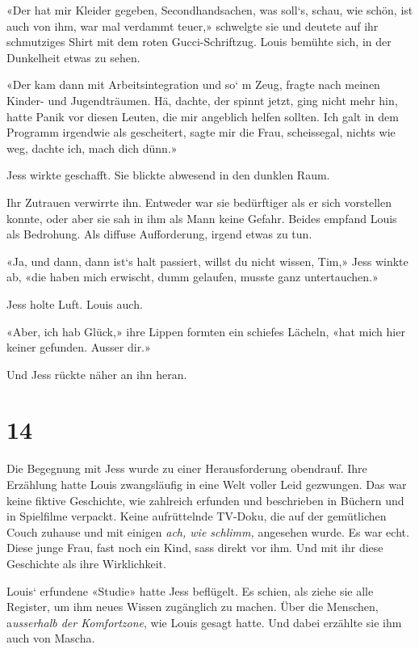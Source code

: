 «Der hat mir Kleider gegeben, Secondhandsachen, was soll`s, schau, wie
schön, ist auch von ihm, war mal verdammt teuer,» schwelgte sie und
deutete auf ihr schmutziges Shirt mit dem roten Gucci-Schriftzug. Louis
bemühte sich, in der Dunkelheit etwas zu sehen.

«Der kam dann mit Arbeitsintegration und so` m Zeug, fragte nach meinen
Kinder- und Jugendträumen. Hä, dachte, der spinnt jetzt, ging nicht mehr
hin, hatte Panik vor diesen Leuten, die mir angeblich helfen sollten.
Ich galt in dem Programm irgendwie als gescheitert, sagte mir die Frau,
scheissegal, nichts wie weg, dachte ich, mach dich dünn.»

Jess wirkte geschafft. Sie blickte abwesend in den dunklen Raum.

Ihr Zutrauen verwirrte ihn. Entweder war sie bedürftiger als er sich
vorstellen konnte, oder aber sie sah in ihm als Mann keine Gefahr.
Beides empfand Louis als Bedrohung. Als diffuse Aufforderung, irgend
etwas zu tun.

«Ja, und dann, dann ist`s halt passiert, willst du nicht wissen, Tim,»
Jess winkte ab, «die haben mich erwischt, dumm gelaufen, musste ganz
untertauchen.»

Jess holte Luft. Louis auch.

«Aber, ich hab Glück,» ihre Lippen formten ein schiefes Lächeln, «hat
mich hier keiner gefunden. Ausser dir.»

Und Jess rückte näher an ihn heran.

\chapter{14}\label{section-13}

Die Begegnung mit Jess wurde zu einer Herausforderung obendrauf. Ihre
Erzählung hatte Louis zwangsläufig in eine Welt voller Leid gezwungen.
Das war keine fiktive Geschichte, wie zahlreich erfunden und beschrieben
in Büchern und in Spielfilme verpackt. Keine aufrüttelnde TV-Doku, die
auf der gemütlichen Couch zuhause und mit einigen \emph{ach, wie
schlimm,} angesehen wurde. Es war echt. Diese junge Frau, fast noch ein
Kind, sass direkt vor ihm. Und mit ihr diese Geschichte als ihre
Wirklichkeit.

Louis` erfundene «Studie» hatte Jess beflügelt. Es schien, als ziehe sie
alle Register, um ihm neues Wissen zugänglich zu machen. Über die
Menschen, a\emph{usserhalb der Komfortzone}, wie Louis gesagt hatte. Und
dabei erzählte sie ihm auch von Mascha.

